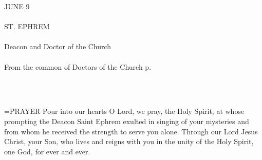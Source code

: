 \begin{center}\normalsize \begin{center}\normalsize JUNE 9\\\\
\footnotesize \footnotesize ST. EPHREM\\\\
\footnotesize \footnotesize Deacon and Doctor of the Church\\\\
\footnotesize \footnotesize From the common of Doctors of the Church p. \\\\
\footnotesize \end{center}\\
\end{center}

\hangindent=\parindent \small{PRAYER 
Pour into our hearts O Lord, we pray, the Holy Spirit,
at whose prompting the Deacon Saint Ephrem
exulted in singing of your mysteries
and from whom he received the strength
to serve you alone.
Through our Lord Jesus Christ, your Son,
who lives and reigns with you in the unity of the Holy Spirit,
one God, for ever and ever.\\}
 
